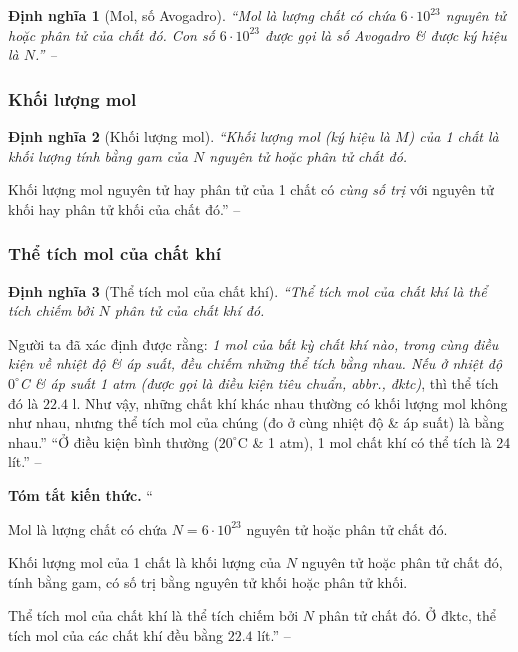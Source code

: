 \documentclass{article}
\numberwithin{equation}{section}
\newtheorem{dinhnghia}{Định nghĩa}[section]
\begin{document}
\begin{dinhnghia}[Mol, số Avogadro]
	``\emph{Mol} là lượng chất có chứa $6\cdot 10^{23}$ nguyên tử hoặc phân tử của chất đó. Con số $6\cdot 10^{23}$ được gọi là \emph{số Avogadro} \& được ký hiệu là $N$.'' -- \cite[p. 63]{SGK_Hoa_Hoc_8}
\end{dinhnghia}

\subsubsection{Khối lượng mol}

\begin{dinhnghia}[Khối lượng mol]
	``\emph{Khối lượng mol} (ký hiệu là $M$) của 1 chất là khối lượng tính bằng gam của $N$ nguyên tử hoặc phân tử chất đó.
\end{dinhnghia}
Khối lượng mol nguyên tử hay phân tử của 1 chất có \textit{cùng số trị} với nguyên tử khối hay phân tử khối của chất đó.'' -- \cite[p. 63]{SGK_Hoa_Hoc_8}

\subsubsection{Thể tích mol của chất khí}

\begin{dinhnghia}[Thể tích mol của chất khí]
	``\emph{Thể tích mol của chất khí} là thể tích chiếm bởi $N$ phân tử của chất khí đó.
\end{dinhnghia}
Người ta đã xác định được rằng: \textit{1 mol của bất kỳ chất khí nào, trong cùng điều kiện về nhiệt độ \& áp suất, đều chiếm những thể tích bằng nhau. Nếu ở nhiệt độ $0^\circ$C \& áp suất 1 atm (được gọi là \emph{điều kiện tiêu chuẩn}, abbr., \emph{đktc})}, thì thể tích đó là $22.4$ l. Như vậy, những chất khí khác nhau thường có khối lượng mol không như nhau, nhưng thể tích mol của chúng (đo ở cùng nhiệt độ \& áp suất) là bằng nhau.'' ``Ở điều kiện bình thường ($20^\circ$C \& 1 atm), 1 mol chất khí có thể tích là 24 lít.'' -- \cite[pp. 63--64]{SGK_Hoa_Hoc_8}
\vspace{2mm}

\noindent\textbf{Tóm tắt kiến thức.}
``\begin{enumerate*}
	\item[\textbf{1.}] Mol là lượng chất có chứa $N = 6\cdot 10^{23}$ nguyên tử hoặc phân tử chất đó.
	\item[\textbf{2.}] Khối lượng mol của 1 chất là khối lượng của $N$ nguyên tử hoặc phân tử chất đó, tính bằng gam, có số trị bằng nguyên tử khối hoặc phân tử khối.
	\item[\textbf{3.}] Thể tích mol của chất khí là thể tích chiếm bởi $N$ phân tử chất đó. Ở đktc, thể tích mol của các chất khí đều bằng $22.4$ lít.'' -- \cite[p. 64]{SGK_Hoa_Hoc_8}
\end{enumerate*}
\end{document}
